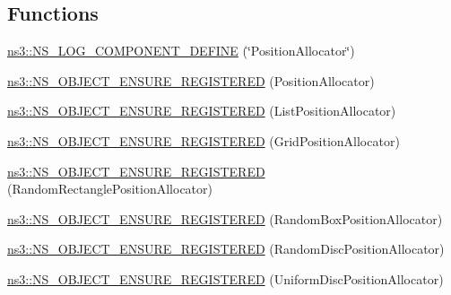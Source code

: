 \subsection*{Functions}
\begin{DoxyCompactItemize}
\item 
\hyperlink{namespacens3_af731b1e9ec15c80954b93906321d4f87}{ns3\+::\+N\+S\+\_\+\+L\+O\+G\+\_\+\+C\+O\+M\+P\+O\+N\+E\+N\+T\+\_\+\+D\+E\+F\+I\+NE} (\char`\"{}Position\+Allocator\char`\"{})
\item 
\hyperlink{namespacens3_a72ac02b3f44f61cf095315882d85c5f5}{ns3\+::\+N\+S\+\_\+\+O\+B\+J\+E\+C\+T\+\_\+\+E\+N\+S\+U\+R\+E\+\_\+\+R\+E\+G\+I\+S\+T\+E\+R\+ED} (Position\+Allocator)
\item 
\hyperlink{namespacens3_aefb94f93df0d07db3fec8afd5781a9cb}{ns3\+::\+N\+S\+\_\+\+O\+B\+J\+E\+C\+T\+\_\+\+E\+N\+S\+U\+R\+E\+\_\+\+R\+E\+G\+I\+S\+T\+E\+R\+ED} (List\+Position\+Allocator)
\item 
\hyperlink{namespacens3_a8a9052057a160cfb7f622b8c1135ad6b}{ns3\+::\+N\+S\+\_\+\+O\+B\+J\+E\+C\+T\+\_\+\+E\+N\+S\+U\+R\+E\+\_\+\+R\+E\+G\+I\+S\+T\+E\+R\+ED} (Grid\+Position\+Allocator)
\item 
\hyperlink{namespacens3_ae07884ddb0506ee2e9b257a9f247ae82}{ns3\+::\+N\+S\+\_\+\+O\+B\+J\+E\+C\+T\+\_\+\+E\+N\+S\+U\+R\+E\+\_\+\+R\+E\+G\+I\+S\+T\+E\+R\+ED} (Random\+Rectangle\+Position\+Allocator)
\item 
\hyperlink{namespacens3_acff9e706d9f8581ca00e85baf2b29e4c}{ns3\+::\+N\+S\+\_\+\+O\+B\+J\+E\+C\+T\+\_\+\+E\+N\+S\+U\+R\+E\+\_\+\+R\+E\+G\+I\+S\+T\+E\+R\+ED} (Random\+Box\+Position\+Allocator)
\item 
\hyperlink{namespacens3_a1482ba34db3f828c5f264e5216dbca4c}{ns3\+::\+N\+S\+\_\+\+O\+B\+J\+E\+C\+T\+\_\+\+E\+N\+S\+U\+R\+E\+\_\+\+R\+E\+G\+I\+S\+T\+E\+R\+ED} (Random\+Disc\+Position\+Allocator)
\item 
\hyperlink{namespacens3_a1b75d4610ed8b2b8a0766e21018d9021}{ns3\+::\+N\+S\+\_\+\+O\+B\+J\+E\+C\+T\+\_\+\+E\+N\+S\+U\+R\+E\+\_\+\+R\+E\+G\+I\+S\+T\+E\+R\+ED} (Uniform\+Disc\+Position\+Allocator)
\end{DoxyCompactItemize}
